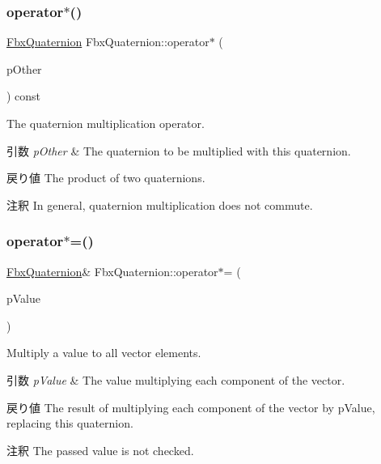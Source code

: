 \subsubsection{\texorpdfstring{operator$\ast$()}{operator*()}\hspace{0.1cm}{\footnotesize\ttfamily [2/2]}}
{\footnotesize\ttfamily \hyperlink{class_fbx_quaternion}{Fbx\+Quaternion} Fbx\+Quaternion\+::operator$\ast$ (\begin{DoxyParamCaption}\item[{const \hyperlink{class_fbx_quaternion}{Fbx\+Quaternion} \&}]{p\+Other }\end{DoxyParamCaption}) const}

The quaternion multiplication operator. 
\begin{DoxyParams}{引数}
{\em p\+Other} & The quaternion to be multiplied with this quaternion. \\
\hline
\end{DoxyParams}
\begin{DoxyReturn}{戻り値}
The product of two quaternions. 
\end{DoxyReturn}
\begin{DoxyRemark}{注釈}
In general, quaternion multiplication does not commute. 
\end{DoxyRemark}
\mbox{\label{class_fbx_quaternion_a39a982f059feefbf7ba164af4712cf01}} 
\subsubsection{\texorpdfstring{operator$\ast$=()}{operator*=()}\hspace{0.1cm}{\footnotesize\ttfamily [1/2]}}
{\footnotesize\ttfamily \hyperlink{class_fbx_quaternion}{Fbx\+Quaternion}\& Fbx\+Quaternion\+::operator$\ast$= (\begin{DoxyParamCaption}\item[{double}]{p\+Value }\end{DoxyParamCaption})}

Multiply a value to all vector elements. 
\begin{DoxyParams}{引数}
{\em p\+Value} & The value multiplying each component of the vector. \\
\hline
\end{DoxyParams}
\begin{DoxyReturn}{戻り値}
The result of multiplying each component of the vector by p\+Value, replacing this quaternion. 
\end{DoxyReturn}
\begin{DoxyRemark}{注釈}
The passed value is not checked. 
\end{DoxyRemark}
\mbox{\label{class_fbx_quaternion_a8d6842472f5712ab72fcdbe3ec4fe093}} 
